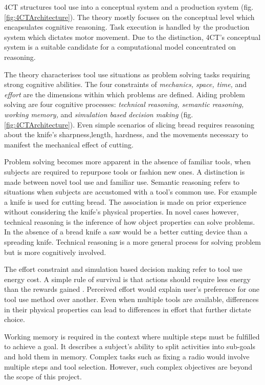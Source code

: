\documentclass[11]{article}
\begin{document}
4CT structures tool use into a conceptual system and a production system (fig. \ref{fig:4CTArchitecture}).
The theory mostly focuses on the conceptual level which encapsulates cognitive reasoning.
Task execution is handled by the production system which dictates motor movement.   
Due to the distinction, 4CT's conceptual system is a suitable candidate for a computational model concentrated on reasoning.


The theory characterises tool use situations as problem solving tasks requiring strong cognitive abilities. 
The four constraints of \emph{mechanics, space, time,} and \emph{effort} are the dimensions within which problems are defined.
Aiding problem solving are four cognitive processes: \emph{technical reasoning, semantic reasoning, working memory,} and \emph{simulation based decision making} (fig. \ref{fig:4CTArchitecture}).  
Even simple scenarios of slicing bread requires reasoning about the knife's sharpness,length, hardness, and the movements necessary to manifest the mechanical effect of cutting. 

Problem solving becomes more apparent in the absence of familiar tools, when subjects are required to repurpose tools or fashion new ones.
A distinction is made between novel tool use and familiar use. 
Semantic reasoning refers to situations when subjects are accustomed with a tool's common use. 
For example a knife is used for cutting bread. 
The association is made on prior experience without considering the knife's physical properties.  
In novel cases however, technical reasoning is the inference of how object properties can solve problems.
In the absence of a bread knife a saw would be a better cutting device than a spreading knife. 
Technical reasoning is a more general process for solving problem but is more cognitively involved.  

The effort constraint and simulation based decision making refer to tool use energy cost. 
A simple rule of survival is that actions should require less energy than the rewards gained \cite{proffitt2006}.
Perceived effort would explain user's preference for one tool use method over another. 
Even when multiple tools are available, differences in their physical properties can lead to differences in effort that further dictate choice. 

Working memory is required in the context where multiple steps must be fulfilled to achieve a goal. 
It describes a subject's ability to split activities into sub-goals and hold them in memory. 
Complex tasks such as fixing a radio would involve multiple steps and tool selection. 
However, such complex objectives are beyond the scope of this project.
\end{document}
